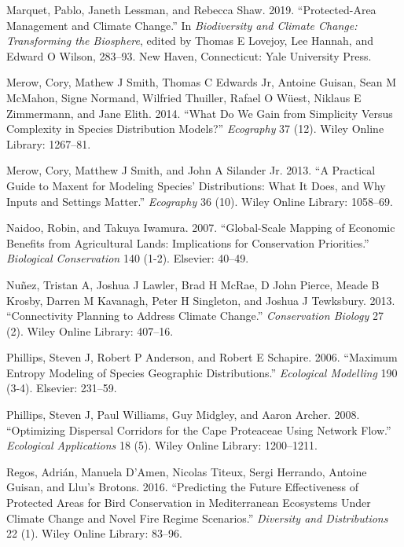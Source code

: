 \documentclass[]{article}
\begin{document}
\leavevmode\hypertarget{ref-marquet_2019}{}%
Marquet, Pablo, Janeth Lessman, and Rebecca Shaw. 2019. ``Protected-Area Management and Climate Change.'' In \emph{Biodiversity and Climate Change: Transforming the Biosphere}, edited by Thomas E Lovejoy, Lee Hannah, and Edward O Wilson, 283--93. New Haven, Connecticut: Yale University Press.

\leavevmode\hypertarget{ref-merow2014we}{}%
Merow, Cory, Mathew J Smith, Thomas C Edwards Jr, Antoine Guisan, Sean M McMahon, Signe Normand, Wilfried Thuiller, Rafael O Wüest, Niklaus E Zimmermann, and Jane Elith. 2014. ``What Do We Gain from Simplicity Versus Complexity in Species Distribution Models?'' \emph{Ecography} 37 (12). Wiley Online Library: 1267--81.

\leavevmode\hypertarget{ref-merow2013practical}{}%
Merow, Cory, Matthew J Smith, and John A Silander Jr. 2013. ``A Practical Guide to Maxent for Modeling Species' Distributions: What It Does, and Why Inputs and Settings Matter.'' \emph{Ecography} 36 (10). Wiley Online Library: 1058--69.

\leavevmode\hypertarget{ref-naidoo2007global}{}%
Naidoo, Robin, and Takuya Iwamura. 2007. ``Global-Scale Mapping of Economic Benefits from Agricultural Lands: Implications for Conservation Priorities.'' \emph{Biological Conservation} 140 (1-2). Elsevier: 40--49.

\leavevmode\hypertarget{ref-nunez2013connectivity}{}%
Nuñez, Tristan A, Joshua J Lawler, Brad H McRae, D John Pierce, Meade B Krosby, Darren M Kavanagh, Peter H Singleton, and Joshua J Tewksbury. 2013. ``Connectivity Planning to Address Climate Change.'' \emph{Conservation Biology} 27 (2). Wiley Online Library: 407--16.

\leavevmode\hypertarget{ref-phillips2006maximum}{}%
Phillips, Steven J, Robert P Anderson, and Robert E Schapire. 2006. ``Maximum Entropy Modeling of Species Geographic Distributions.'' \emph{Ecological Modelling} 190 (3-4). Elsevier: 231--59.

\leavevmode\hypertarget{ref-phillips2008optimizing}{}%
Phillips, Steven J, Paul Williams, Guy Midgley, and Aaron Archer. 2008. ``Optimizing Dispersal Corridors for the Cape Proteaceae Using Network Flow.'' \emph{Ecological Applications} 18 (5). Wiley Online Library: 1200--1211.

\leavevmode\hypertarget{ref-regos2016predicting}{}%
Regos, Adrián, Manuela D'Amen, Nicolas Titeux, Sergi Herrando, Antoine Guisan, and Lluı's Brotons. 2016. ``Predicting the Future Effectiveness of Protected Areas for Bird Conservation in Mediterranean Ecosystems Under Climate Change and Novel Fire Regime Scenarios.'' \emph{Diversity and Distributions} 22 (1). Wiley Online Library: 83--96.
\end{document}
